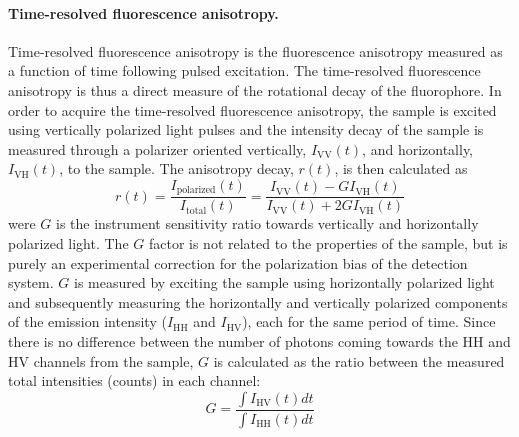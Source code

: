  \paragraph{Time-resolved fluorescence anisotropy.} Time-resolved fluorescence anisotropy is the fluorescence anisotropy measured as a function of time following pulsed excitation.\cite{Lak} The time-resolved fluorescence anisotropy is thus a direct measure of the rotational decay of the fluorophore. In order to acquire the time-resolved fluorescence anisotropy, the sample is excited using vertically polarized light pulses and the intensity decay of the sample is measured through a polarizer oriented vertically, $I_\mathrm{VV}(t)$, and horizontally, $I_\mathrm{VH}(t)$, to the sample. The anisotropy decay, $r(t)$, is then calculated as
\begin{equation}
 r(t)=\frac{I_\mathrm{polarized}(t)}{I_\mathrm{total}(t)}=\frac{I_\mathrm{VV}(t)-GI_\mathrm{VH}(t)}{I_\mathrm{VV}(t)+2GI_\mathrm{VH}(t)}
 \label{eq:ani}
\end{equation}
 were $G$ is the instrument sensitivity ratio towards vertically and horizontally polarized light. The $G$ factor is not related to the properties of the sample, but is purely an experimental correction for the polarization bias of the detection system. $G$ is measured by exciting the sample using horizontally polarized light and subsequently measuring the horizontally and vertically polarized components of the emission intensity ($I_\mathrm{HH}$ and $I_\mathrm{HV}$), each for the same period of time. Since there is no difference between the number of photons coming towards the HH and HV channels from the sample, $G$ is calculated as the ratio between the measured total intensities (counts) in each channel:
\begin{equation}
 G = \frac{\int I_\mathrm{HV}(t)dt}{\int I_\mathrm{HH}(t)dt}
 \label{eq:G}
\end{equation}

